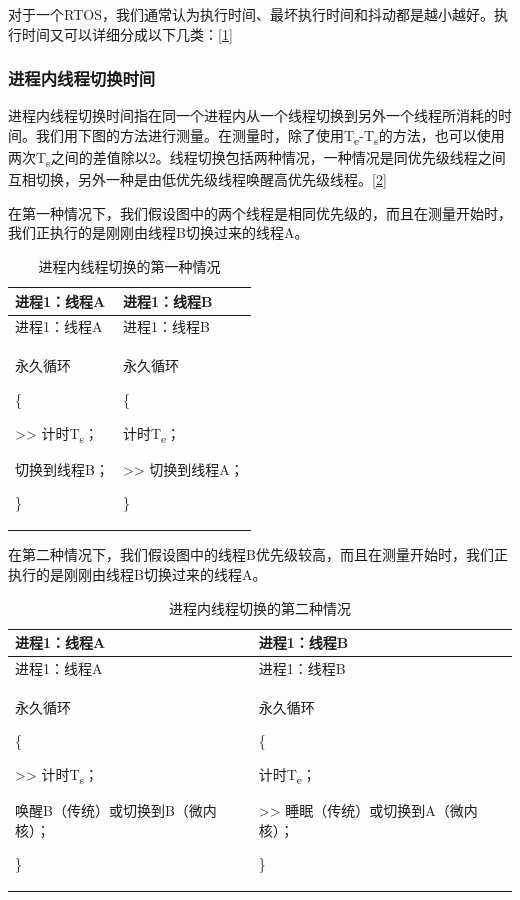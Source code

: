 对于一个RTOS，我们通常认为执行时间、最坏执行时间和抖动都是越小越好。执行时间又可以详细分成以下几类：\hyperref[cite:1-1]{{[}1{]}}

\subsubsection{进程内线程切换时间}\label{subsubsec:1-intra-process-thread-switch}

进程内线程切换时间指在同一个进程内从一个线程切换到另外一个线程所消耗的时间。我们用下图的方法进行测量。在测量时，除了使用T\textsubscript{e}-T\textsubscript{s}的方法，也可以使用两次T\textsubscript{s}之间的差值除以2。线程切换包括两种情况，一种情况是同优先级线程之间互相切换，另外一种是由低优先级线程唤醒高优先级线程。\hyperref[cite:1-2]{{[}2{]}}

在第一种情况下，我们假设图中的两个线程是相同优先级的，而且在测量开始时，我们正执行的是刚刚由线程B切换过来的线程A。

\begin{xltabular}{\textwidth}{@{}>{\hsize\raggedright\arraybackslash}X>{\hsize\raggedright\arraybackslash}X@{}}
\caption{进程内线程切换的第一种情况}\label{tab:1-1-intra-process-thread-switch-case-1}\\
\toprule
进程1：线程A & 进程1：线程B\tabularnewline
\endfirsthead
\toprule
进程1：线程A & 进程1：线程B\tabularnewline
\midrule
\endhead
\bottomrule
\endlastfoot
永久循环

\{

\textgreater\textgreater{} 计时T\textsubscript{s}；

切换到线程B；

\}\strut
 & 永久循环

\{

计时T\textsubscript{e}；

\textgreater\textgreater{} 切换到线程A；

\}\strut
\tabularnewline
\end{xltabular}

在第二种情况下，我们假设图中的线程B优先级较高，而且在测量开始时，我们正执行的是刚刚由线程B切换过来的线程A。

\begin{xltabular}{\textwidth}{@{}>{\hsize\raggedright\arraybackslash}X>{\hsize\raggedright\arraybackslash}X@{}}
\caption{进程内线程切换的第二种情况}\label{tab:1-2-intra-process-thread-switch-case-2}\\
\toprule
进程1：线程A & 进程1：线程B\tabularnewline
\endfirsthead
\toprule
进程1：线程A & 进程1：线程B\tabularnewline
\midrule
\endhead
\bottomrule
\endlastfoot
永久循环

\{

\textgreater\textgreater{} 计时T\textsubscript{s}；

唤醒B（传统）或切换到B（微内核）；

\}\strut
 & 永久循环

\{

计时T\textsubscript{e}；

\textgreater\textgreater{} 睡眠（传统）或切换到A（微内核）；

\}\strut
\tabularnewline
\end{xltabular}

